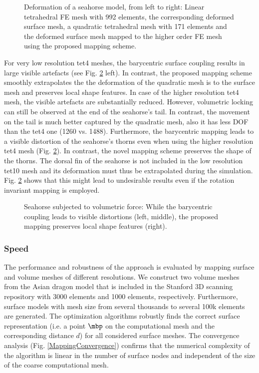 \begin{figure}
   \centering   
	\caption{Deformation of a seahorse model, from left to right: Linear tetrahedral FE mesh with 992 elements, the corresponding deformed surface mesh, a quadratic tetrahedral mesh with 171 elements and the deformed surface mesh mapped to the higher order FE mesh using the proposed mapping scheme.}
\label{SeahorseSimulation}
\end{figure}

For very low resolution tet4 meshes, the barycentric surface coupling results in large visible artefacts (see Fig. \ref{SeahorseSimulationCloseUp} left). In contrast, the proposed mapping scheme smoothly extrapolates the the deformation of the quadratic mesh is to the surface mesh and preserves local shape features. In case of the higher resolution tet4 mesh, the visible artefacts are substantially reduced. However, volumetric locking can still be observed at the end of the seahorse's tail. In contrast, the movement on the tail is much better captured by the quadratic mesh, also it has less DOF than the tet4 one (1260 vs. 1488). Furthermore, the barycentric mapping leads to a visible distortion of the seahorse's thorns even when using the higher resolution tet4 mesh (Fig. \ref{SeahorseSimulationCloseUp}). In contrast, the novel mapping scheme preserves the shape of the thorns. The dorsal fin of the seahorse is not included in the low resolution tet10 mesh and its deformation must thus be extrapolated during the simulation. Fig. \ref{SeahorseSimulationCloseUp} shows that this might lead to undesirable results even if the rotation invariant mapping is employed.


\begin{figure}
   \centering   
	\caption{Seahorse subjected to volumetric force: While the barycentric coupling leads to visible distortions (left, middle), the proposed mapping preserves local shape features (right).}
\label{SeahorseSimulationCloseUp}
\end{figure}


\subsubsection{Speed}

The performance and robustness of the approach is evaluated by mapping surface and volume meshes of different resolutions. We construct two volume meshes from the Asian dragon model that is included in the Stanford 3D scanning repository with 3000 elements and 1000 elements, respectively. Furthermore, surface models with mesh size from several thousands to several 100k elements are generated. The optimization algorithms robustly finds the correct surface representation (i.e. a point $\mbp$ on the computational mesh and the corresponding distance $d$) for all considered surface meshes. The convergence analysis (Fig. \ref{MappingConvergence}) confirms that the numerical complexity of the algorithm is linear in the number of surface nodes and independent of the size of the coarse computational mesh. 

